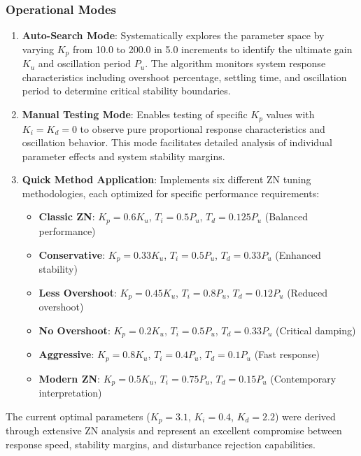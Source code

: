 \subsubsection*{Operational Modes}

\begin{enumerate}
    \item \textbf{Auto-Search Mode}: Systematically explores the parameter space by varying $K_p$ from 10.0 to 200.0 in 5.0 increments to identify the ultimate gain $K_u$ and oscillation period $P_u$. The algorithm monitors system response characteristics including overshoot percentage, settling time, and oscillation period to determine critical stability boundaries.

    \item \textbf{Manual Testing Mode}: Enables testing of specific $K_p$ values with $K_i = K_d = 0$ to observe pure proportional response characteristics and oscillation behavior. This mode facilitates detailed analysis of individual parameter effects and system stability margins.

    \item \textbf{Quick Method Application}: Implements six different ZN tuning methodologies, each optimized for specific performance requirements:
    \begin{itemize}
        \item \textbf{Classic ZN}: $K_p = 0.6K_u$, $T_i = 0.5P_u$, $T_d = 0.125P_u$ (Balanced performance)
        \item \textbf{Conservative}: $K_p = 0.33K_u$, $T_i = 0.5P_u$, $T_d = 0.33P_u$ (Enhanced stability)
        \item \textbf{Less Overshoot}: $K_p = 0.45K_u$, $T_i = 0.8P_u$, $T_d = 0.12P_u$ (Reduced overshoot)
        \item \textbf{No Overshoot}: $K_p = 0.2K_u$, $T_i = 0.5P_u$, $T_d = 0.33P_u$ (Critical damping)
        \item \textbf{Aggressive}: $K_p = 0.8K_u$, $T_i = 0.4P_u$, $T_d = 0.1P_u$ (Fast response)
        \item \textbf{Modern ZN}: $K_p = 0.5K_u$, $T_i = 0.75P_u$, $T_d = 0.15P_u$ (Contemporary interpretation)
    \end{itemize}
\end{enumerate}

The current optimal parameters ($K_p = 3.1$, $K_i = 0.4$, $K_d = 2.2$) were derived through extensive ZN analysis and represent an excellent compromise between response speed, stability margins, and disturbance rejection capabilities.

